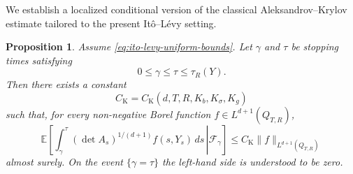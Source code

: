 \documentclass[12pt,oneside, reqno]{amsart}
\newtheorem{proposition}[theorem]{Proposition}
\numberwithin{equation}{section}
\begin{document}
	We establish a localized conditional version of the classical Aleksandrov–Krylov estimate tailored to the present It\^o–L\'evy setting.
	
	\begin{proposition}
		\label{thm:local-weighted-krylov}
		Assume \eqref{eq:ito-levy-uniform-bounds}. Let $\gamma$ and $\tau$ be	stopping times satisfying
		\[
		0\le\gamma\le\tau\le\tau_R(Y).
		\]
		Then there exists a constant
		\[
		C_{\mathrm K}=C_{\mathrm K}(d,T,R,K_b,K_\sigma,K_g)
		\]
		such that, for every non-negative Borel function
		$f\in L^{d+1}(Q_{T,R})$,
		\begin{equation}
			\label{eq:weighted-conditional-krylov}
			\mathbb E\left[\left.\int_\gamma^\tau(\det A_s)^{1/(d+1)}f(s,Y_s)\,ds\,\right|\mathcal F_\gamma\right]
			\le
			C_{\mathrm K}\|f\|_{L^{d+1}(Q_{T,R})}
		\end{equation}
		almost surely. On the event $\{\gamma=\tau\}$ the left-hand side is understood to be zero.
	\end{proposition}
	
\end{document}
